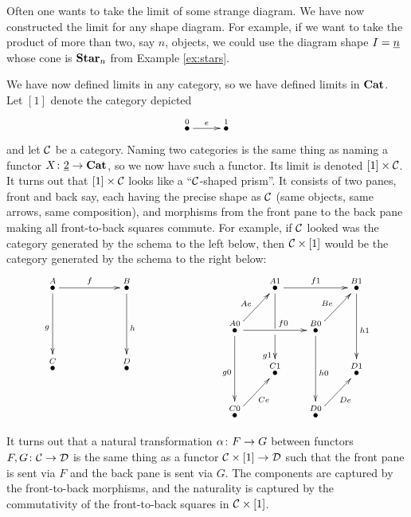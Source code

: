 \begin{example}

Often one wants to take the limit of some strange diagram. We have now constructed the limit for any shape diagram. For example, if we want to take the product of more than two, say $n$, objects, we could use the diagram shape $I=\underline{n}$ whose cone is ${\bf Star}_n$ from Example \ref{ex:stars}.

\end{example}

\begin{example}\label{ex:product version of nat trans}

We have now defined limits in any category, so we have defined limits in ${\bf Cat}$. Let $[1]$ denote the category depicted 
$$\xymatrix{\LMO{0}\ar[r]^e&\LMO{1}}$$
and let $\mathcal{C}$ be a category. Naming two categories is the same thing as naming a functor $X\colon\underline{2}\rightarrow{\bf Cat}$, so we now have such a functor. Its limit is denoted $[1]\times\mathcal{C}$. It turns out that $[1]\times\mathcal{C}$ looks like a “$\mathcal{C}$-shaped prism”. It consists of two panes, front and back say, each having the precise shape as $\mathcal{C}$ (same objects, same arrows, same composition), and morphisms from the front pane to the back pane making all front-to-back squares commute. For example, if $\mathcal{C}$ looked was the category generated by the schema to the left below, then $\mathcal{C}\times[1]$ would be the category generated by the schema to the right below:
$$
\xymatrix{
\LMO{A}\ar[rr]^f\ar[dd]_g&&\LMO{B}\ar[dd]^h\\\\\LMO{C}&&\LMO{D}
}
\hspace{1in}
\xymatrix@=20pt{
&\LMO{A1}\ar[rr]^{f1}\ar'[d][dd]_(.6){g1}&&\LMO{B1}\ar[dd]^{h1}\\
\LMO{A0}\ar[ur]^{Ae}\ar[rr]^(.6){f0}\ar[dd]_{g0}&&\LMO{B0}\ar[ur]^{Be}\ar[dd]^{h0}\\
&\LMO{C1}&&\LMO{D1}\\
\LMO{C0}\ar[ur]_{Ce}&&\LMO{D0}\ar[ur]_{De}&
}
$$

It turns out that a natural transformation $\alpha\colon F\rightarrow G$ between functors $F,G\colon\mathcal{C}\rightarrow\mathcal{D}$ is the same thing as a functor $\mathcal{C}\times[1]\rightarrow\mathcal{D}$ such that the front pane is sent via $F$ and the back pane is sent via $G$. The components are captured by the front-to-back morphisms, and the naturality is captured by the commutativity of the front-to-back squares in $\mathcal{C}\times[1]$.

\end{example}

